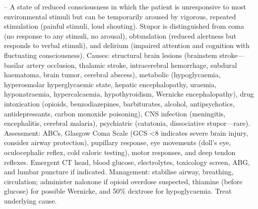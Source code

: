 -- A state of reduced consciousness in which the patient is unresponsive to most environmental stimuli but can be temporarily aroused by vigorous, repeated stimulation (painful stimuli, loud shouting). Stupor is distinguished from coma (no response to any stimuli, no arousal), obtundation (reduced alertness but responds to verbal stimuli), and delirium (impaired attention and cognition with fluctuating consciousness). Causes: structural brain lesions (brainstem stroke—basilar artery occlusion, thalamic stroke, intracerebral hemorrhage, subdural haematoma, brain tumor, cerebral abscess), metabolic (hypoglycaemia, hyperosmolar hyperglycaemic state, hepatic encephalopathy, uraemia, hyponatraemia, hypercalcaemia, hypothyroidism, Wernicke encephalopathy), drug intoxication (opioids, benzodiazepines, barbiturates, alcohol, antipsychotics, antidepressants, carbon monoxide poisoning), CNS infection (meningitis, encephalitis, cerebral malaria), psychiatric (catatonia, dissociative stupor—rare). Assessment: ABCs, Glasgow Coma Scale (GCS <8 indicates severe brain injury, consider airway protection), pupillary response, eye movements (doll's eye, oculocephalic reflex, cold caloric testing), motor responses, and deep tendon reflexes. Emergent CT head, blood glucose, electrolytes, toxicology screen, ABG, and lumbar puncture if indicated. Management: stabilise airway, breathing, circulation; administer naloxone if opioid overdose suspected, thiamine (before glucose) for possible Wernicke, and 50\% dextrose for hypoglycaemia. Treat underlying cause.

